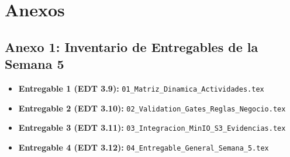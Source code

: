 \documentclass[12pt,a4paper]{article}
\begin{document}
\vspace{0.4cm}

\section{Anexos}
\subsection*{Anexo 1: Inventario de Entregables de la Semana 5}
\begin{itemize}[leftmargin=1.5em, itemsep=1.5pt]
    \item \textbf{Entregable 1 (EDT 3.9):} \texttt{01\_Matriz\_Dinamica\_Actividades.tex}
    \item \textbf{Entregable 2 (EDT 3.10):} \texttt{02\_Validation\_Gates\_Reglas\_Negocio.tex}
    \item \textbf{Entregable 3 (EDT 3.11):} \texttt{03\_Integracion\_MinIO\_S3\_Evidencias.tex}
    \item \textbf{Entregable 4 (EDT 3.12):} \texttt{04\_Entregable\_General\_Semana\_5.tex}
\end{itemize}
\end{document}

